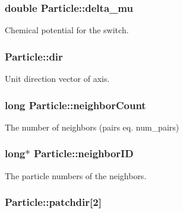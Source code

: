 \hypertarget{class_particle_a14464961ee5c7acbcfebddb72156e1bd}{
\subsubsection[{delta\+\_\+mu}]{\setlength{\rightskip}{0pt plus 5cm}double Particle\+::delta\+\_\+mu}}\label{class_particle_a14464961ee5c7acbcfebddb72156e1bd}


Chemical potential for the switch. 

\hypertarget{class_particle_a6c8d0f728a634e7ec018fa25e8d59fc6}{
\subsubsection[{dir}]{ Particle\+::dir}}\label{class_particle_a6c8d0f728a634e7ec018fa25e8d59fc6}


Unit direction vector of axis. 

\hypertarget{class_particle_a66f7e76a4292ea79499e062667a46409}{
\subsubsection[{neighbor\+Count}]{\setlength{\rightskip}{0pt plus 5cm}long Particle\+::neighbor\+Count}}\label{class_particle_a66f7e76a4292ea79499e062667a46409}


The number of neighbors (pairs eq. num\+\_\+pairs) 

\hypertarget{class_particle_a0d119c0ca1644995840d35b701afb566}{
\subsubsection[{neighbor\+I\+D}]{\setlength{\rightskip}{0pt plus 5cm}long$\ast$ Particle\+::neighbor\+I\+D}}\label{class_particle_a0d119c0ca1644995840d35b701afb566}


The particle numbers of the neighbors. 

\hypertarget{class_particle_a079cbdc927c2390bfbf1aeed90bb94e6}{
\subsubsection[{patchdir}]{ Particle\+::patchdir\mbox{[}2\mbox{]}}}\label{class_particle_a079cbdc927c2390bfbf1aeed90bb94e6}


